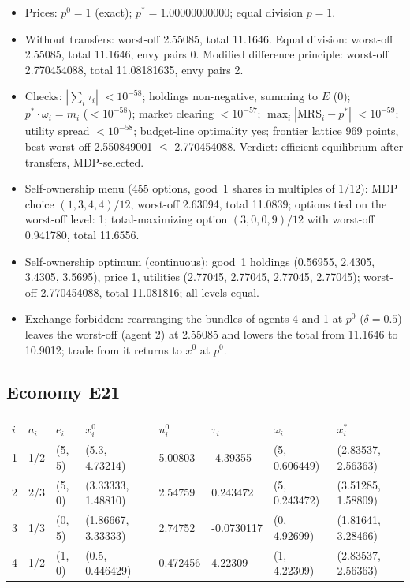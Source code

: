 \begin{itemize}[leftmargin=1.2em,itemsep=0pt,topsep=2pt]\footnotesize
\item Prices: $p^0 = 1$ (exact); $p^* = 1.00000000000$; equal division $p = 1$.
\item Without transfers: worst-off 2.55085, total 11.1646. Equal division: worst-off 2.55085, total 11.1646, envy pairs 0. Modified difference principle: worst-off 2.770454088, total 11.08181635, envy pairs 2.
\item Checks: $|\sum_i\tau_i|$ $<10^{-58}$; holdings non-negative, summing to $E$ (0); $p^*\cdot\omega_i = m_i$ ($<10^{-58}$); market clearing $<10^{-57}$; $\max_i|\mathrm{MRS}_i - p^*|$ $<10^{-59}$; utility spread $<10^{-58}$; budget-line optimality yes; frontier lattice 969 points, best worst-off 2.550849001 $\leq$ 2.770454088. Verdict: efficient equilibrium after transfers, MDP-selected.
\item Self-ownership menu (455 options, good~1 shares in multiples of $1/12$): MDP choice $(1, 3, 4, 4)/12$, worst-off 2.63094, total 11.0839; options tied on the worst-off level: 1; total-maximizing option $(3, 0, 0, 9)/12$ with worst-off 0.941780, total 11.6556.
\item Self-ownership optimum (continuous): good~1 holdings (0.56955, 2.4305, 3.4305, 3.5695), price 1, utilities (2.77045, 2.77045, 2.77045, 2.77045); worst-off 2.770454088, total 11.081816; all levels equal.
\item Exchange forbidden: rearranging the bundles of agents 4 and 1 at $p^0$ ($\delta = 0.5$) leaves the worst-off (agent 2) at 2.55085 and lowers the total from 11.1646 to 10.9012; trade from it returns to $x^0$ at $p^0$.
\end{itemize}

\subsection*{Economy E21}
\label{ec:E21}
{\scriptsize\setlength{\tabcolsep}{3pt}
\begin{tabular}{@{}llllllll@{}}
\toprule
$i$ & $a_i$ & $e_i$ & $x^0_i$ & $u^0_i$ & $\tau_i$ & $\omega_i$ & $x^*_i$ \\
\midrule
1 & 1/2 & (5, 5) & (5.3, 4.73214) & 5.00803 & -4.39355 & (5, 0.606449) & (2.83537, 2.56363) \\
2 & 2/3 & (5, 0) & (3.33333, 1.48810) & 2.54759 & 0.243472 & (5, 0.243472) & (3.51285, 1.58809) \\
3 & 1/3 & (0, 5) & (1.86667, 3.33333) & 2.74752 & -0.0730117 & (0, 4.92699) & (1.81641, 3.28466) \\
4 & 1/2 & (1, 0) & (0.5, 0.446429) & 0.472456 & 4.22309 & (1, 4.22309) & (2.83537, 2.56363) \\
\bottomrule\end{tabular}}

